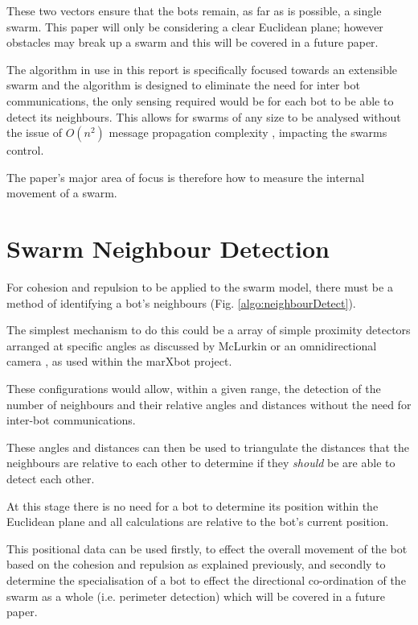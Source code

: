 \documentclass[10pt,journal,letterpaper,twoside]{IEEEtran}
\newcommand{\stability}{internal movement}
\begin{document}
These two vectors ensure that the bots remain, as far as is possible,
a single swarm. This paper will only be considering a clear Euclidean
plane; however obstacles may break up a swarm and this will be covered
in a future paper.

The algorithm in use in this report is specifically focused towards an
extensible swarm and the algorithm is designed to eliminate the need
for inter bot communications, the only sensing required would be for
each bot to be able to detect its neighbours. This allows for swarms
of any size to be analysed without the issue of $O(n^2)$ message
propagation complexity \cite{PADZMAKC09}, \cite{MJ08} impacting the
swarms control.

The paper's major area of focus is therefore how to measure the \stability{} of a swarm.

\section{Swarm Neighbour Detection\label{section:swarmNeighbourDetection}}

For cohesion and repulsion to be applied to the swarm model, there
must be a method of identifying a bot's neighbours
(Fig. \ref{algo:neighbourDetect}).

The simplest mechanism to do this could be a array of simple proximity
detectors arranged at specific angles as discussed by McLurkin
\cite{MJ08} or an omnidirectional camera \cite{HSAUAPPRFM11},
\cite{MD07} as used within the marXbot project.

These configurations would allow, within a given range, the detection
of the number of neighbours and their relative angles and distances
without the need for inter-bot communications.

These angles and distances can then be used to triangulate the
distances that the neighbours are relative to each other to determine
if they \textit{should} be are able to detect each other.

At this stage there is no need for a bot to determine its position
within the Euclidean plane and all calculations are relative to the
bot's current position.

This positional data can be used firstly, to effect the overall
movement of the bot based on the cohesion and repulsion as explained
previously, and secondly to determine the specialisation of a bot to
effect the directional co-ordination of the swarm as a whole
(i.e. perimeter detection) which will be covered in a future paper.
\end{document}
